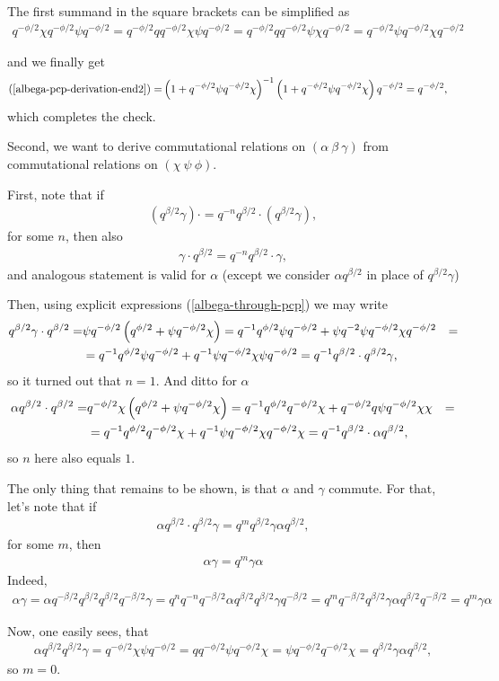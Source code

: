 \documentclass{article}
\newcommand{\lb}{\left (}
\newcommand{\rb}{\right )}
\newcommand{\be}{\begin{eqnarray}}
\newcommand{\ee}{\end{eqnarray}}
\newcommand {\?}{\textit{???}}
\newcommand{\delabel}[1]{(\ref{#1})}
\begin{document}
The first summand in the square brackets can be simplified as
\be
q^{-\phi/2} \chi q^{-\phi/2} \psi q^{-\phi/2} = q^{-\phi/2} q q^{-\phi/2} \chi \psi q^{-\phi/2}
= q^{-\phi/2} q q^{-\phi/2} \psi \chi q^{-\phi/2} = q^{-\phi/2} \psi q^{-\phi/2} \chi q^{-\phi/2} \nonumber
\ee

and we finally get
\be
\delabel{albega-pcp-derivation-end2} = & \qbMinusHalfNorm \qbHalfNorm q^{-\phi/2} = q^{-\phi/2},
\ee
which completes the check.


Second, we want to derive commutational relations on $(\alpha\ \beta\ \gamma)$ from commutational
relations on $(\chi\ \psi\ \phi)$.

First, note that if
\be
\lb q^{\beta/2}\gamma \rb \cdot = q^{-n} q^{\beta/2} \cdot \lb q^{\beta/2}\gamma \rb,
\ee
for some $n$, then also
\be
 \gamma \cdot q^{\beta/2} = q^{-n} q^{\beta/2} \cdot \gamma,
\ee
and analogous statement is valid for $\alpha$
 (except we consider $\alpha q^{\beta/2}$ in place of $q^{\beta/2} \gamma$) 

Then, using explicit expressions \delabel{albega-through-pcp} we may write
\be
q^{\beta/2} \gamma \cdot q^{\beta/2} = & \psi q^{-\phi/2} \qbHalf
= q^{-1} q^{\phi/2} \psi q^{-\phi/2} + \psi q^{-2} \psi q^{-\phi/2} \chi q^{-\phi/2} & = \\
& = q^{-1} q^{\phi/2} \psi q^{-\phi/2} + q^{-1} \psi q^{-\phi/2} \chi \psi q^{-\phi/2} = q^{-1} q^{\beta/2} \cdot q^{\beta/2} \gamma,
\ee
so it turned out that $n = 1$. And ditto for $\alpha$
\be
\alpha q^{\beta/2} \cdot q^{\beta/2} = & q^{-\phi/2} \chi \qbHalf
= q^{-1} q^{\phi/2} q^{-\phi/2} \chi + q^{-\phi/2} q \psi q^{-\phi/2} \chi \chi & = \\
& = q^{-1} q^{\phi/2} q^{-\phi/2} \chi + q^{-1} \psi q^{-\phi/2} \chi q^{-\phi/2} \chi
= q^{-1} q^{\beta/2} \cdot \alpha q^{\beta/2},
\ee
so $n$ here also equals $1$.

The only thing that remains to be shown, is that $\alpha$ and $\gamma$ commute.
For that, let's note that if
\be
\alpha q^{\beta/2} \cdot q^{\beta/2} \gamma = q^m q^{\beta/2} \gamma \alpha q^{\beta/2},
\ee
for some $m$, then
\be
\alpha \gamma = q^m \gamma \alpha
\ee
Indeed,
\be
\alpha \gamma = \alpha q^{-\beta/2} q^{\beta/2} q^{\beta/2} q^{-\beta/2} \gamma
= q^n q^{-n} q^{-\beta/2} \alpha q^{\beta/2} q^{\beta/2} \gamma q^{-\beta/2}
= q^m q^{-\beta/2} q^{\beta/2} \gamma \alpha q^{\beta/2} q^{-\beta/2} = q^m \gamma \alpha
\ee

Now, one easily sees, that
\be
\alpha q^{\beta/2} q^{\beta/2} \gamma = q^{-\phi/2} \chi \psi q^{-\phi/2} = q q^{-\phi/2} \psi q^{-\phi/2} \chi
= \psi q^{-\phi/2} q^{-\phi/2} \chi = q^{\beta/2} \gamma \alpha q^{\beta/2},
\ee
so $m = 0$.
\end{document}
